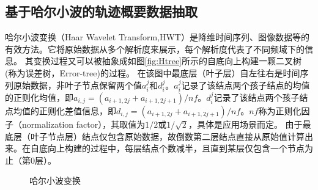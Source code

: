 \subsection{基于哈尔小波的轨迹概要数据抽取}\label{sec-c4-HaarWavelet}
哈尔小波变换（Haar Wavelet Transform,HWT）是降维时间序列、图像数据等的有效方法。它将原始数据从多个解析度来展示，每个解析度代表了不同频域下的信息。
其变换过程又可以被抽象成如图\ref{fig:Htree}所示的自底向上构建一颗二叉树(称为误差树，Error-tree)的过程。
在该图中最底层（叶子层）自左往右是时间序列原始数据，非叶子节点保留两个值$a_{i}^{j}$和$d_{i}^{j}$。$a_{i}^{j}$记录了该结点两个孩子结点的均值的正则化均值，即$a_{i,j}=({a_{i+1,2j}+a_{i+1,2j+1}})/{nf}$。$d_{i}^{j}$记录了该结点两个孩子结点均值的正则化差值信息，即$d_{i,j}=({a_{i+1,2j}+a_{i+1,2j+1}})/{nf}$。$nf$称为正则化因子（normalization factor），其取值为$1/2$或$1/\sqrt{2}$，具体是应用场景而定。
由于最底层（叶子节点层）结点仅包含原始数据，故倒数第二层结点直接从原始值计算出来。在自底向上构建的过程中，每层结点个数减半，且直到某层仅包含一个节点为止（第0层）。

\begin{figure}[t]
	\centering
	\vspace{-10pt}
	\caption{哈尔小波变换}
	\label{fig:HaarTree}
	\vspace{-10pt}
\end{figure}


